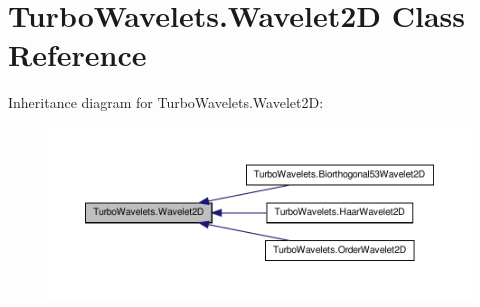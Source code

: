 \hypertarget{class_turbo_wavelets_1_1_wavelet2_d}{\section{\-Turbo\-Wavelets.\-Wavelet2\-D \-Class \-Reference}
\label{class_turbo_wavelets_1_1_wavelet2_d}
}


\-Inheritance diagram for \-Turbo\-Wavelets.\-Wavelet2\-D\-:
\nopagebreak
\begin{figure}[H]
\begin{center}
\leavevmode
\includegraphics[width=350pt]{class_turbo_wavelets_1_1_wavelet2_d__inherit__graph}
\end{center}
\end{figure}
